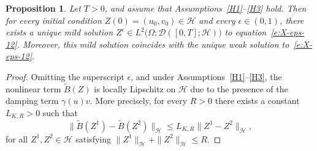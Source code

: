 \documentclass[11pt]{article}
\theoremstyle{plain}
\newtheorem{proposition}[theorem]{Proposition}
\numberwithin{equation}{section}
\begin{document}
\begin{proposition}\label{well-pose-1}
Let $T>0$, and assume that Assumptions~\ref{H1}--\ref{H3} hold. Then for every initial condition $Z(0) = (u_0, v_0) \in \mathcal H$ and every $\epsilon \in (0,1)$, there exists a unique mild solution \(Z^{\epsilon} \in L^2\big(\Omega; \mathcal D([0,T]; \mathcal H)\big)\)
to equation~\eqref{e:X-eps-12}. Moreover, this mild solution coincides with the unique weak solution to~\eqref{e:X-eps-12}.
\end{proposition}
\begin{proof}
Omitting the superscript $\epsilon$, and under Assumptions~\ref{H1}--\ref{H3},
the nonlinear term $\tilde B(Z)$ is locally Lipschitz on $\mathcal H$ due to
the presence of the damping term $\gamma(u)v$.
More precisely, for every $R>0$ there exists a constant $L_{K,R}>0$ such that
\begin{equation}\label{assump-1}
\|\tilde B(Z^1)-\tilde B(Z^2)\|_{\mathcal H}
\le L_{K,R}\|Z^1-Z^2\|_{\mathcal H},
\end{equation}
for all $Z^1,Z^2\in\mathcal H$ satisfying
$\|Z^1\|_{\mathcal H}+\|Z^2\|_{\mathcal H}\le R$.


\end{proof}
\end{document}
